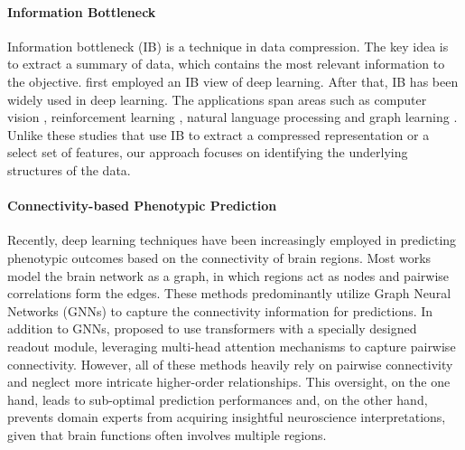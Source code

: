 \paragraph{Information Bottleneck}
Information bottleneck (IB) \citep{tishby2000information} is a technique in data compression. The key idea is to extract a summary of data, which contains the most relevant information to the objective. \citet{alemi2016deep} first employed an IB view of deep learning. After that, IB has been widely used in deep learning. The applications span areas such as computer vision \citep{luo2019significance,peng2018variational}, reinforcement learning \citep{goyal2019infobot,igl2019generalization}, natural language processing \citep{wang2020learning} and graph learning \citep{yu2020graph,yu2022improving, xu2021infogcl,wu2020graph}. Unlike these studies that use IB to extract a compressed representation or a select set of features, our approach focuses on identifying the underlying structures of the data.

\paragraph{Connectivity-based Phenotypic Prediction}
Recently, deep learning techniques have been increasingly employed in predicting phenotypic outcomes based on the connectivity of brain regions. Most works \citep{ahmedt2021graph,li2019graph,cui2022interpretable,kan2022fbnetgen,cui2022braingb,said2023neurograph} model the brain network as a graph, in which regions act as nodes and pairwise correlations form the edges. These methods predominantly utilize Graph Neural Networks (GNNs) to capture the connectivity information for predictions. In addition to GNNs, \citet{kan2022brain} proposed to use transformers with a specially designed readout module, leveraging multi-head attention mechanisms to capture pairwise connectivity. However, all of these methods heavily rely on pairwise connectivity and neglect more intricate higher-order relationships. This oversight, on the one hand, leads to sub-optimal prediction performances and, on the other hand, prevents domain experts from acquiring insightful neuroscience interpretations, given that brain functions often involves multiple regions.